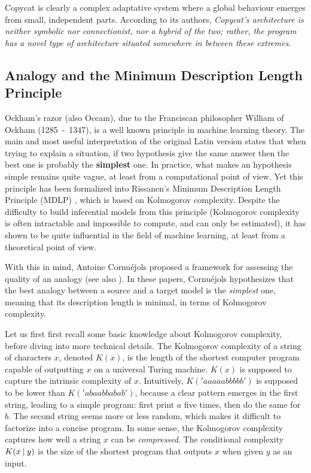 Copycat is clearly a complex adaptative system where a global behaviour emerges
from small, independent parts. According to its authors, \textit{Copycat's
architecture is neither symbolic nor connectionist, nor a hybrid of the two;
rather, the program has a novel type of architecture situated somewhere in
between these extremes}.

\subsection{Analogy and the Minimum Description Length Principle}

Ockham's razor (also Occam), due to the Franciscan philosopher William
of Ockham (1285~-~1347), is a well known principle in machine learning theory.
The main and most useful interpretation of the original Latin version states
that when trying to explain a situation, if two hypothesis give the same answer
then the best one is probably the \textbf{simplest} one. In practice, what
makes an hypothesis simple remains quite vague, at least from a computational
point of view. Yet this principle has been formalized into Rissanen's Minimum
Description Length Principle (MDLP) \cite{Ris78}, which is based on Kolmogorov
complexity. Despite the difficulty to build inferential models from this
principle (Kolmogorov complexity is often intractable and impossible to
compute, and can only be estimated), it has shown to be quite influential in
the field of machine learning, at least from a theoretical point of view.

With this in mind, Antoine Cornuéjols proposed a framework for assessing the
quality of an analogy \cite{CorMLS96} (see also \cite{CorJFA96}). In these
papers, Cornuéjols hypothesizes that the best analogy between a source and a
target model is the \textit{simplest} one, meaning that its description length
is minimal, in terms of Kolmogorov complexity.

Let us first first recall some basic knowledge about Kolmogorov complexity,
before diving into more technical details. The Kolmogorov complexity of a
string of characters $x$, denoted $K(x)$, is the length of the shortest
computer program capable of outputting $x$ on a universal Turing machine. $K(x)$ is supposed to capture the
intrinsic complexity of $x$. Intuitively, $K('aaaaabbbbb')$ is supposed to be
lower than $K('abaabbabab')$, because a clear pattern emerges in the first
string, leading to a simple program: first print $a$ five times, then do the
same for $b$. The second string seems more or less random, which makes it
difficult to factorize into a concise program. In some sense, the Kolmogorov
complexity captures how well a string $x$ can be \textit{compressed}. The
conditional complexity $K(x \:\vert\: y)$ is the size of the shortest program that
outputs $x$ when given $y$ as an input.

